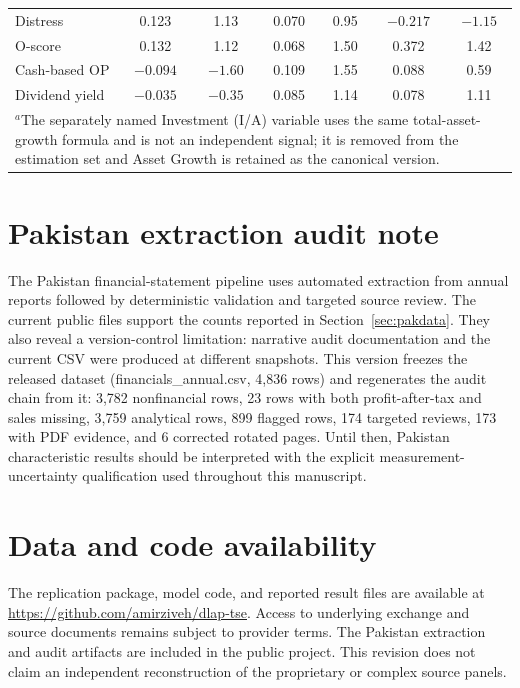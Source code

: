 \documentclass[12pt]{article}
\begin{document}
\begin{table}[htbp]
\begin{tabular}{l cc cc cc}
Distress & 0.123 & 1.13 & 0.070 & 0.95 & $-0.217$ & $-1.15$ \\
O-score & 0.132 & 1.12 & 0.068 & 1.50 & 0.372 & 1.42 \\
Cash-based OP & $-0.094$ & $-1.60$ & 0.109 & 1.55 & 0.088 & 0.59 \\
Dividend yield & $-0.035$ & $-0.35$ & 0.085 & 1.14 & 0.078 & 1.11 \\
\bottomrule
\multicolumn{7}{p{14.5cm}}{\footnotesize $^{a}$The separately named Investment (I/A) variable uses the same total-asset-growth formula and is not an independent signal; it is removed from the estimation set and Asset Growth is retained as the canonical version.} \\
\end{tabular}
\end{table}

\clearpage
\section{Pakistan extraction audit note}\label{app:pakaudit}

The Pakistan financial-statement pipeline uses automated extraction from annual reports followed by deterministic validation and targeted source review. The current public files support the counts reported in Section~\ref{sec:pakdata}. They also reveal a version-control limitation: narrative audit documentation and the current CSV were produced at different snapshots. This version freezes the released dataset (financials\_annual.csv, 4,836 rows) and regenerates the audit chain from it: 3,782 nonfinancial rows, 23 rows with both profit-after-tax and sales missing, 3,759 analytical rows, 899 flagged rows, 174 targeted reviews, 173 with PDF evidence, and 6 corrected rotated pages. Until then, Pakistan characteristic results should be interpreted with the explicit measurement-uncertainty qualification used throughout this manuscript.

\section*{Data and code availability}

The replication package, model code, and reported result files are available at \url{https://github.com/amirziveh/dlap-tse}. Access to underlying exchange and source documents remains subject to provider terms. The Pakistan extraction and audit artifacts are included in the public project. This revision does not claim an independent reconstruction of the proprietary or complex source panels.


\end{document}

